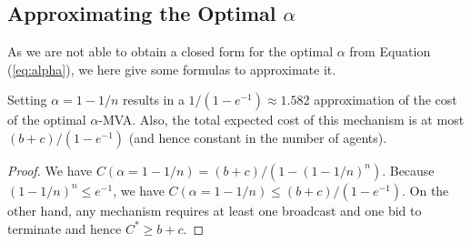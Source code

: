 
\subsection{Approximating the Optimal $\alpha$}



As we are not able to obtain a closed form for the optimal $\alpha$ from
Equation (\ref{eq:alpha}), we here give some formulas to approximate it.




\begin{theorem}
Setting $\alpha = 1-1/n$ results in a $1/(1-e^{-1}) \approx 1.582$ approximation of the
cost of the optimal $\alpha$-MVA.  Also, the total expected cost of this
mechanism is at most $(b+c) / (1-e^{-1})$ (and hence constant in the
number of agents).
\end{theorem}

\begin{proof}
  We have $C(\alpha = 1-1/n) = (b+c)/(1-(1-1/n)^n)$. Because $(1-1/n)^n
  \leq e^{-1}$, we have $C(\alpha = 1-1/n) \leq (b+c)/(1-e^{-1})$.
On the other hand, any mechanism requires at
least one broadcast and one bid to terminate and hence $C^* \geq
b+c$. %
\end{proof}

